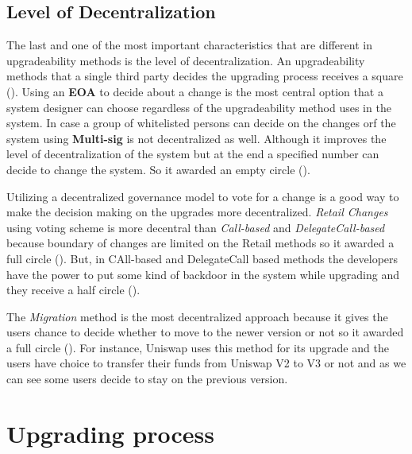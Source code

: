  \subsection{Level of Decentralization}

The last and one of the most important characteristics that are different in upgradeability methods is the level of decentralization. An upgradeability methods that a single third party decides the upgrading process receives a square (\XBox). 
Using an \textbf{EOA} to decide about a change is the most central option that a system designer can choose regardless of the upgradeability method uses in the system. 
In case a group of whitelisted persons can decide on the changes orf the system using \textbf{Multi-sig} is not decentralized as well. Although it improves the level of decentralization of the system but at the end a specified number can decide to change the system. So it awarded an empty circle (\Circle).

Utilizing a decentralized governance model to vote for a change is a good way to make the decision making on the upgrades more decentralized. \textit{Retail Changes} using voting scheme is more decentral than \textit{Call-based} and \textit{DelegateCall-based} because boundary of changes are limited on the Retail methods so it awarded a full circle (\CIRCLE). But, in CAll-based and DelegateCall based methods the developers have the power to put some kind of backdoor in the system while upgrading and they receive a half circle (\LEFTcircle). 

The \textit{Migration} method is the most decentralized approach because it gives the users chance to decide whether to move to the newer version or not so it awarded a full circle (\CIRCLE). For instance, Uniswap uses this method for its upgrade and the users have choice to transfer their funds from Uniswap V2 to V3 or not and as we can see some users decide to stay on the previous version.



 \section{Upgrading process}
  

